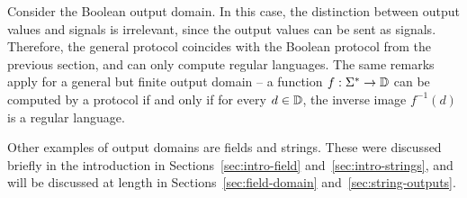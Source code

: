 \begin{myexample}
    Consider the Boolean output domain. In this case, the distinction between output values and signals is irrelevant, since the output values can be sent as signals. Therefore, the general protocol coincides with the Boolean protocol from the previous section, and  can only compute regular languages.  The same remarks apply for a general but finite output domain -- a function $f : \Sigma^* \to \mathbb D$ can be computed by a protocol if and only if for every $d \in \mathbb D$, the inverse image $f^{-1}(d)$ is a regular language.
\end{myexample}

Other examples of output domains are fields and strings. These were discussed  briefly in the introduction in Sections~\ref{sec:intro-field} and~\ref{sec:intro-strings},  and will be discussed at length in Sections~\ref{sec:field-domain} and~\ref{sec:string-outputs}.  




